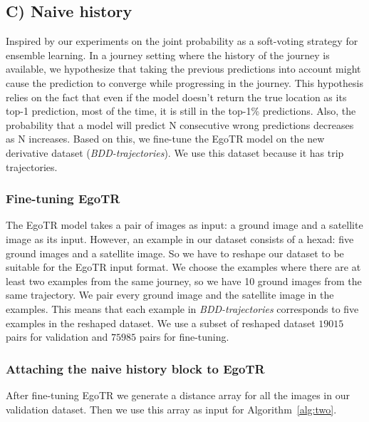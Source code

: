 \documentclass[10pt,letterpaper]{article}
\begin{document}
\FloatBarrier

\subsection*{C) Naive history}
Inspired by our experiments on the joint probability as a soft-voting strategy for ensemble learning. In a journey setting where the history of the journey is available, we hypothesize that taking the previous predictions into account might cause the prediction to converge while progressing in the journey. This hypothesis relies on the fact that even if the model doesn't return the true location as its top-1 prediction, most of the time, it is still in the top-1\% predictions. Also, the probability that a model will predict N consecutive wrong predictions decreases as N increases. Based on this, we fine-tune the EgoTR model on the new derivative dataset (\emph{BDD-trajectories}). We use this dataset because it has trip trajectories.

\subsubsection*{Fine-tuning EgoTR}
The EgoTR model takes a pair of images as input: a ground image and a satellite image as its input. However, an example in our dataset consists of a hexad: five ground images and a satellite image. So we have to reshape our dataset to be suitable for the EgoTR input format. We choose the examples where there are at least two examples from the same journey, so we have 10 ground images from the same trajectory. We pair every ground image and the satellite image in the examples. This means that each example in \emph{BDD-trajectories} corresponds to five examples in the reshaped dataset. We use a subset of reshaped dataset $19015$ pairs for validation and $75985$ pairs for fine-tuning.

\subsubsection*{Attaching the naive history block to EgoTR}
After fine-tuning EgoTR we generate a distance array for all the images in our validation dataset. Then we use this array as input for Algorithm~\ref{alg:two}.
\end{document}
